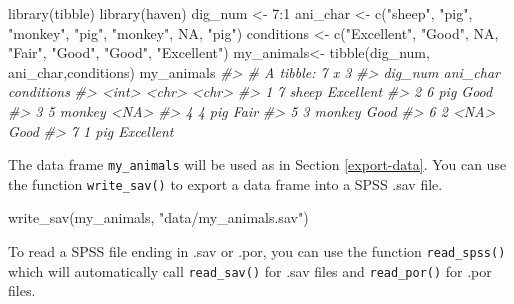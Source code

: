 \documentclass[
]{book}
\newenvironment{Shaded}{\begin{snugshade}}{\end{snugshade}}
\newcommand{\CommentTok}[1]{\textcolor[rgb]{0.56,0.35,0.01}{\textit{#1}}}
\newcommand{\ConstantTok}[1]{\textcolor[rgb]{0.00,0.00,0.00}{#1}}
\newcommand{\DecValTok}[1]{\textcolor[rgb]{0.00,0.00,0.81}{#1}}
\newcommand{\FunctionTok}[1]{\textcolor[rgb]{0.00,0.00,0.00}{#1}}
\newcommand{\NormalTok}[1]{#1}
\newcommand{\OtherTok}[1]{\textcolor[rgb]{0.56,0.35,0.01}{#1}}
\newcommand{\SpecialCharTok}[1]{\textcolor[rgb]{0.00,0.00,0.00}{#1}}
\newcommand{\StringTok}[1]{\textcolor[rgb]{0.31,0.60,0.02}{#1}}
\begin{document}
\begin{Shaded}
\begin{Highlighting}[]
\FunctionTok{library}\NormalTok{(tibble)}
\FunctionTok{library}\NormalTok{(haven)}
\NormalTok{dig\_num }\OtherTok{\textless{}{-}} \DecValTok{7}\SpecialCharTok{:}\DecValTok{1}
\NormalTok{ani\_char }\OtherTok{\textless{}{-}} \FunctionTok{c}\NormalTok{(}\StringTok{"sheep"}\NormalTok{, }\StringTok{"pig"}\NormalTok{, }\StringTok{"monkey"}\NormalTok{, }\StringTok{"pig"}\NormalTok{, }\StringTok{"monkey"}\NormalTok{, }\ConstantTok{NA}\NormalTok{, }\StringTok{"pig"}\NormalTok{)}
\NormalTok{conditions }\OtherTok{\textless{}{-}} \FunctionTok{c}\NormalTok{(}\StringTok{"Excellent"}\NormalTok{, }\StringTok{"Good"}\NormalTok{, }\ConstantTok{NA}\NormalTok{, }\StringTok{"Fair"}\NormalTok{, }\StringTok{"Good"}\NormalTok{, }\StringTok{"Good"}\NormalTok{, }\StringTok{"Excellent"}\NormalTok{)}
\NormalTok{my\_animals}\OtherTok{\textless{}{-}} \FunctionTok{tibble}\NormalTok{(dig\_num, ani\_char,conditions)}
\NormalTok{my\_animals}
\CommentTok{\#\textgreater{} \# A tibble: 7 x 3}
\CommentTok{\#\textgreater{}   dig\_num ani\_char conditions}
\CommentTok{\#\textgreater{}     \textless{}int\textgreater{} \textless{}chr\textgreater{}    \textless{}chr\textgreater{}     }
\CommentTok{\#\textgreater{} 1       7 sheep    Excellent }
\CommentTok{\#\textgreater{} 2       6 pig      Good      }
\CommentTok{\#\textgreater{} 3       5 monkey   \textless{}NA\textgreater{}      }
\CommentTok{\#\textgreater{} 4       4 pig      Fair      }
\CommentTok{\#\textgreater{} 5       3 monkey   Good      }
\CommentTok{\#\textgreater{} 6       2 \textless{}NA\textgreater{}     Good      }
\CommentTok{\#\textgreater{} 7       1 pig      Excellent}
\end{Highlighting}
\end{Shaded}

The data frame \texttt{my\_animals} will be used as in Section \ref{export-data}. You can use the function \texttt{write\_sav()} to export a data frame into a SPSS .sav file.

\begin{Shaded}
\begin{Highlighting}[]
\FunctionTok{write\_sav}\NormalTok{(my\_animals, }\StringTok{"data/my\_animals.sav"}\NormalTok{)}
\end{Highlighting}
\end{Shaded}

To read a SPSS file ending in .sav or .por, you can use the function \texttt{read\_spss()} which will automatically call \texttt{read\_sav()} for .sav files and \texttt{read\_por()} for .por files.
\end{document}
